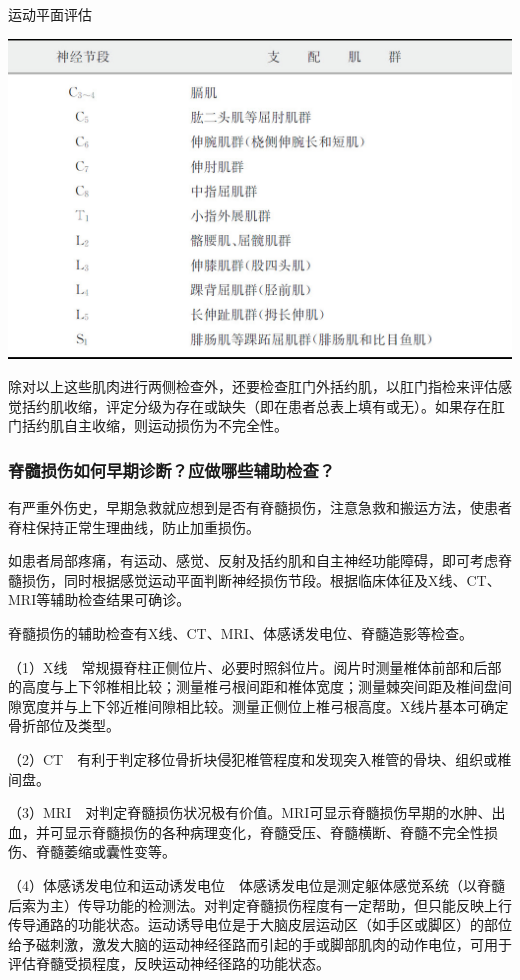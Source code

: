 \begin{table}[htbp]
\centering
\caption{运动平面评估}
\label{tab18-4}
\includegraphics{./images/Image00144.jpg}
\end{table}

除对以上这些肌肉进行两侧检查外，还要检查肛门外括约肌，以肛门指检来评估感觉括约肌收缩，评定分级为存在或缺失（即在患者总表上填有或无）。如果存在肛门括约肌自主收缩，则运动损伤为不完全性。

\subsubsection{脊髓损伤如何早期诊断？应做哪些辅助检查？}

有严重外伤史，早期急救就应想到是否有脊髓损伤，注意急救和搬运方法，使患者脊柱保持正常生理曲线，防止加重损伤。

如患者局部疼痛，有运动、感觉、反射及括约肌和自主神经功能障碍，即可考虑脊髓损伤，同时根据感觉运动平面判断神经损伤节段。根据临床体征及X线、CT、MRI等辅助检查结果可确诊。

脊髓损伤的辅助检查有X线、CT、MRI、体感诱发电位、脊髓造影等检查。

（1）X线　常规摄脊柱正侧位片、必要时照斜位片。阅片时测量椎体前部和后部的高度与上下邻椎相比较；测量椎弓根间距和椎体宽度；测量棘突间距及椎间盘间隙宽度并与上下邻近椎间隙相比较。测量正侧位上椎弓根高度。X线片基本可确定骨折部位及类型。

（2）CT　有利于判定移位骨折块侵犯椎管程度和发现突入椎管的骨块、组织或椎间盘。

（3）MRI　对判定脊髓损伤状况极有价值。MRI可显示脊髓损伤早期的水肿、出血，并可显示脊髓损伤的各种病理变化，脊髓受压、脊髓横断、脊髓不完全性损伤、脊髓萎缩或囊性变等。

（4）体感诱发电位和运动诱发电位　体感诱发电位是测定躯体感觉系统（以脊髓后索为主）传导功能的检测法。对判定脊髓损伤程度有一定帮助，但只能反映上行传导通路的功能状态。运动诱导电位是于大脑皮层运动区（如手区或脚区）的部位给予磁刺激，激发大脑的运动神经径路而引起的手或脚部肌肉的动作电位，可用于评估脊髓受损程度，反映运动神经径路的功能状态。

